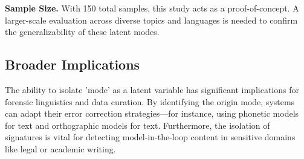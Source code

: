 {\bf Sample Size.}
With 150 total samples, this study acts as a proof-of-concept.
A larger-scale evaluation across diverse topics and languages is needed to confirm the generalizability of these latent modes.

\subsection{Broader Implications}

The ability to isolate 'mode' as a latent variable has significant implications for forensic linguistics and data curation.
By identifying the origin mode, systems can adapt their error correction strategies—for instance, using phonetic models for \dictated text and orthographic models for \typed text.
Furthermore, the isolation of \aigen signatures is vital for detecting model-in-the-loop content in sensitive domains like legal or academic writing.

